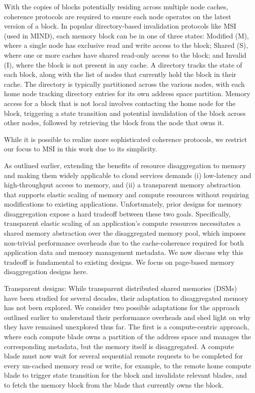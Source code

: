 With the copies of blocks potentially residing across multiple node caches, coherence protocols are required to ensure each node operates on the latest version of a block. In popular directory-based invalidation protocols like MSI (used in MIND), each memory block can be in one of three states: Modified (M), where a single node has exclusive read and write access to the block; Shared (S), where one or more caches have shared read-only access to the block; and Invalid (I), where the block is not present in any cache. A directory tracks the state of each block, along with the list of nodes that currently hold the block in their cache. The directory is typically partitioned across the various nodes, with each home node tracking directory entries for its own address space partition. Memory access for a block that is not local involves contacting the home node for the block, triggering a state transition and potential invalidation of the block across other nodes, followed by retrieving the block from the node that owns it.

While it is possible to realize more sophisticated coherence protocols, we restrict our focus to MSI in this work due to its simplicity.

As outlined earlier, extending the benefits of resource disaggregation to memory and making them widely applicable to cloud services demands (i) low-latency and high-throughput access to memory, and (ii) a transparent memory abstraction that supports elastic scaling of memory and compute resources without requiring modifications to existing applications. Unfortunately, prior designs for memory disaggregation expose a hard tradeoff between these two goals. Specifically, transparent elastic scaling of an application’s compute resources necessitates a shared memory abstraction over the disaggregated memory pool, which imposes non-trivial performance overheads due to the cache-coherence required for both application data and memory management metadata. We now discuss why this tradeoff is fundamental to existing designs. We focus on page-based memory disaggregation designs here.

Transparent designs: While transparent distributed shared memories (DSMs) have been studied for several decades, their adaptation to disaggregated memory has not been explored. We consider two possible adaptations for the approach outlined earlier to understand their performance overheads and shed light on why they have remained unexplored thus far. The first is a compute-centric approach, where each compute blade owns a partition of the address space and manages the corresponding metadata, but the memory itself is disaggregated. A compute blade must now wait for several sequential remote requests to be completed for every un-cached memory read or write, for example, to the remote home compute blade to trigger state transition for the block and invalidate relevant blades, and to fetch the memory block from the blade that currently owns the block.

